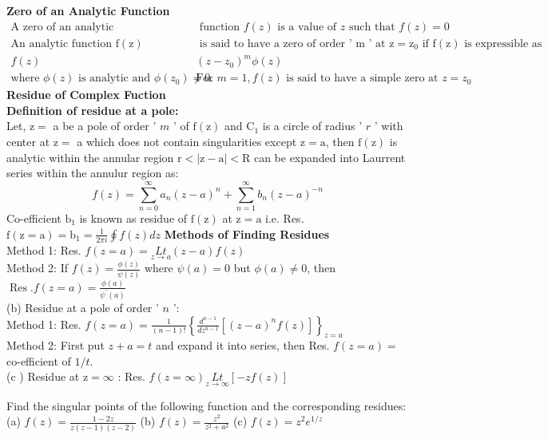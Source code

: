 \textbf{Zero of an Analytic Function}\\
\begin{align*}
\text{A zero of an analytic}&\text{ function $f(z)$ is a value of $z$ such that $f(z)=0$}\\
\text{An analytic function $\mathrm{f}(\mathrm{z})$}&\text{ is said to have a zero of order ' $\mathrm{m}$ ' at $\mathrm{z}=\mathrm{z}_{0}$ if $\mathrm{f}(\mathrm{z})$ is expressible as}\\
f(z)&\left(z-z_{0}\right)^{m} \phi(z)\\
\text{where $\phi(z)$ is analytic and $\phi\left(z_{0}\right) \neq 0$. }&\text{For $m=1, f(z)$ is said to have a simple zero at $z=z_{0}$}
\end{align*}
\textbf{Residue of Complex Fuction}\\
\textbf{Definition of residue at a pole:}\\
Let, $\mathrm{z}=$ a be a pole of order ' $m$ ' of $\mathrm{f}(\mathrm{z})$ and $\mathrm{C}_{1}$ is a circle of radius ' $r$ ' with center at $\mathrm{z}=$ a which does not contain singularities except $\mathrm{z}=\mathrm{a}$, then $\mathrm{f}(\mathrm{z})$ is analytic within the annular region $\mathrm{r}<|\mathrm{z}-\mathrm{a}|<\mathrm{R}$ can be expanded into Laurrent series within the annulur region as:
$$f(z)=\sum_{n=0}^{\infty} a_{n}(z-a)^{n}+\sum_{n=1}^{\infty} b_{n}(z-a)^{-n}$$
Co-efficient $\mathrm{b}_{1}$ is known as residue of $\mathrm{f}(\mathrm{z})$ at $\mathrm{z}=\mathrm{a}$ i.e. Res. $\mathrm{f}(\mathrm{z}=\mathrm{a})=\mathrm{b}_{1}=\frac{1}{2 \pi i} \oint f(z) d z$
\textbf{Methods of Finding Residues}\\
Method 1: Res. $f(z=a)=\underset{z \rightarrow a}{L t}(z-a) f(z)$\\
Method 2: If $f(z)=\frac{\phi(z)}{\psi(z)}$ where $\psi(a)=0$ but $\phi(a) \neq 0$, then $\operatorname{Res} . f(z=a)=\frac{\phi(a)}{\psi^{\prime}(a)}$\\
(b) Residue at a pole of order ' $n$ ':\\
Method 1: Res. $f(z=a)=\frac{1}{(n-1) !}\left\{\frac{d^{n-1}}{d z^{n-1}}\left[(z-a)^{n} f(z)\right]\right\}_{z=a}$\\
Method 2: First put $z+a=t$ and expand it into series, then Res. $f(z=a)=$ co-efficient of $1 / t$.\\
(c ) Residue at $\mathrm{z}=\infty$ : Res. $f(z=\infty) \underset{z \rightarrow \infty}{L t}[-z f(z)]$
\begin{exercise}
	 Find the singular points of the following function and the corresponding residues:\\
	(a) $f(z)=\frac{1-2 z}{z(z-1)(z-2)}$\quad
	(b) $f(z)=\frac{z^{2}}{z^{2}+a^{2}}$\quad
	(c) $f(z)=z^{2} e^{1 / z}$
\end{exercise}

